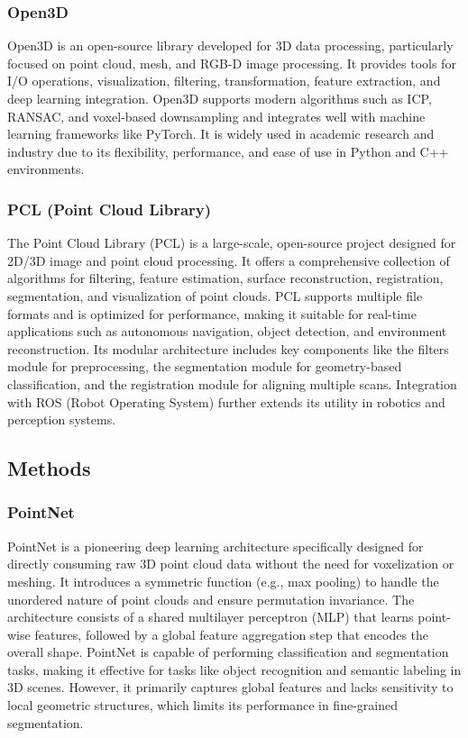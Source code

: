 \documentclass[../report.tex]{subfiles}
\begin{document}
    \subsubsection{\textbf{Open3D}}
    
    Open3D is an open-source library developed for 3D data processing, particularly focused on point cloud, mesh, and RGB-D image processing. It provides tools for I/O operations, visualization, filtering, transformation, feature extraction, and deep learning integration. Open3D supports modern algorithms such as ICP, RANSAC, and voxel-based downsampling and integrates well with machine learning frameworks like PyTorch. It is widely used in academic research and industry due to its flexibility, performance, and ease of use in Python and C++ environments.\cite{Open3D_Library}
    
    \subsubsection{\textbf{PCL} (Point Cloud Library)}
    
    The Point Cloud Library (PCL) is a large-scale, open-source project designed for 2D/3D image and point cloud processing\cite{PCL}. It offers a comprehensive collection of algorithms for filtering, feature estimation, surface reconstruction, registration, segmentation, and visualization of point clouds. PCL supports multiple file formats and is optimized for performance, making it suitable for real-time applications such as autonomous navigation, object detection, and environment reconstruction. Its modular architecture includes key components like the filters module for preprocessing, the segmentation module for geometry-based classification, and the registration module for aligning multiple scans. Integration with ROS (Robot Operating System) further extends its utility in robotics and perception systems.\cite{PCL}
    \subsection{Methods}
    \subsubsection{\textbf{PointNet}}
    
    PointNet\cite{PointNet} is a pioneering deep learning architecture specifically designed for directly consuming raw 3D point cloud data without the need for voxelization or meshing. It introduces a symmetric function (e.g., max pooling) to handle the unordered nature of point clouds and ensure permutation invariance. The architecture consists of a shared multilayer perceptron (MLP) that learns point-wise features, followed by a global feature aggregation step that encodes the overall shape. PointNet is capable of performing classification and segmentation tasks, making it effective for tasks like object recognition and semantic labeling in 3D scenes. However, it primarily captures global features and lacks sensitivity to local geometric structures, which limits its performance in fine-grained segmentation.
    
\end{document}
